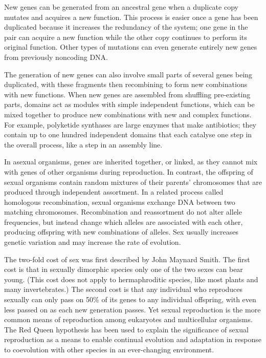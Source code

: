 New genes can be generated from an ancestral gene when a duplicate copy mutates and acquires a new function. This process is easier once a gene has been duplicated because it increases the redundancy of the system; one gene in the pair can acquire a new function while the other copy continues to perform its original function. Other types of mutations can even generate entirely new genes from previously noncoding DNA.

The generation of new genes can also involve small parts of several genes being duplicated, with these fragments then recombining to form new combinations with new functions. When new genes are assembled from shuffling pre-existing parts, domains act as modules with simple independent functions, which can be mixed together to produce new combinations with new and complex functions. For example, polyketide synthases are large enzymes that make antibiotics; they contain up to one hundred independent domains that each catalyse one step in the overall process, like a step in an assembly line.

In asexual organisms, genes are inherited together, or linked, as they cannot mix with genes of other organisms during reproduction. In contrast, the offspring of sexual organisms contain random mixtures of their parents' chromosomes that are produced through independent assortment. In a related process called homologous recombination, sexual organisms exchange DNA between two matching chromosomes. Recombination and reassortment do not alter allele frequencies, but instead change which alleles are associated with each other, producing offspring with new combinations of alleles. Sex usually increases genetic variation and may increase the rate of evolution.

The two-fold cost of sex was first described by John Maynard Smith. The first cost is that in sexually dimorphic species only one of the two sexes can bear young. (This cost does not apply to hermaphroditic species, like most plants and many invertebrates.) The second cost is that any individual who reproduces sexually can only pass on 50\% of its genes to any individual offspring, with even less passed on as each new generation passes. Yet sexual reproduction is the more common means of reproduction among eukaryotes and multicellular organisms. The Red Queen hypothesis has been used to explain the significance of sexual reproduction as a means to enable continual evolution and adaptation in response to coevolution with other species in an ever-changing environment.

